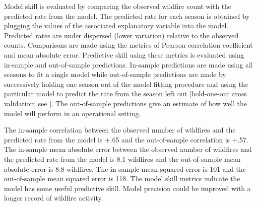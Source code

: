 \documentclass[12pt]{iopart}
\begin{document}
Model skill is evaluated by comparing the observed wildfire count with the predicted rate from the model. The predicted rate for each season is obtained by plugging the values of the associated explanatory variable into the model. Predicted rates are under dispersed (lower variation) relative to the observed counts. Comparisons are made using the metrics of Pearson correlation coefficient and mean absolute error. Predictive skill using these metrics is evaluated using in-sample and out-of-sample predictions. In-sample predictions are made using all seasons to fit a single model while out-of-sample predictions are made by successively holding one season out of the model fitting procedure and using the particular model to predict the rate from the season left out [hold-one-out cross validation; see \cite{ElsnerSchmertmann1994}]. The out-of-sample predictions give an estimate of how well the model will perform in an operational setting.

The in-sample correlation between the observed number of wildfires and the predicted rate from the model is $+$.65 and the out-of-sample correlation is $+$.57. The in-sample mean absolute error between the observed number of wildfires and the predicted rate from the model is 8.1 wildfires and the out-of-sample mean absolute error is 8.8 wildfires. The in-sample mean squared error is 101 and the out-of-sample mean squared error is 118. The model skill metrics indicate the model has some useful predictive skill. Model precision could be improved with a longer record of wildfire activity.
\end{document}
